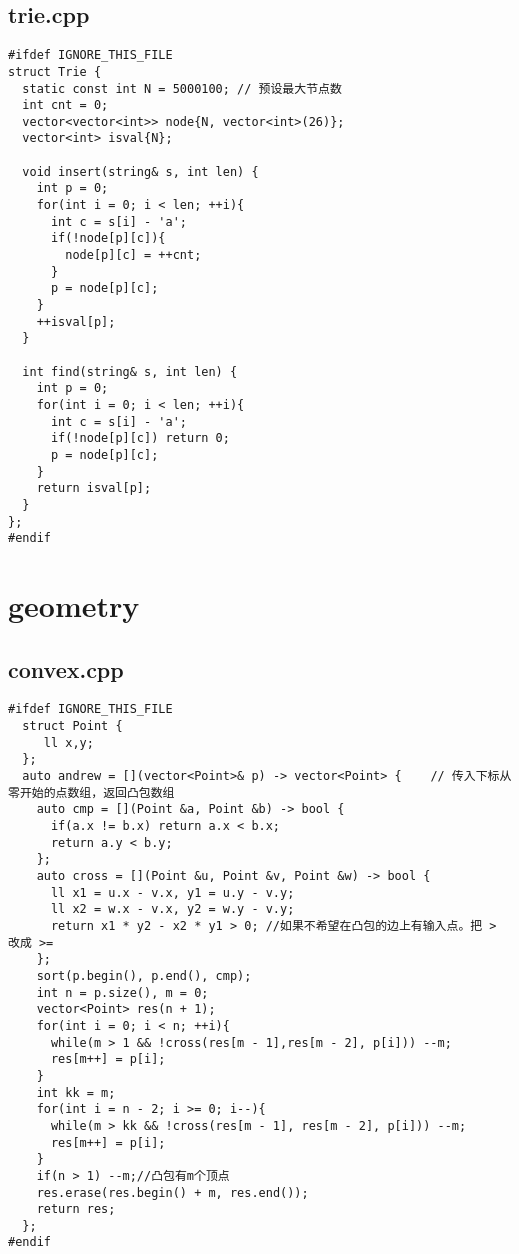 \documentclass[UTF8, a4paper, titlepage, twoside]{ctexart}
\begin{document}
\subsection{trie.cpp}
\begin{verbatim}
#ifdef IGNORE_THIS_FILE
struct Trie {
  static const int N = 5000100; // 预设最大节点数
  int cnt = 0;
  vector<vector<int>> node{N, vector<int>(26)};
  vector<int> isval{N};

  void insert(string& s, int len) {
    int p = 0;
    for(int i = 0; i < len; ++i){
      int c = s[i] - 'a';
      if(!node[p][c]){
        node[p][c] = ++cnt;
      }
      p = node[p][c];
    }
    ++isval[p];
  }

  int find(string& s, int len) {
    int p = 0;
    for(int i = 0; i < len; ++i){
      int c = s[i] - 'a';
      if(!node[p][c]) return 0;
      p = node[p][c];
    }
    return isval[p];
  }
};
#endif
\end{verbatim}

\clearpage
\section{geometry}
\subsection{convex.cpp}
\begin{verbatim}
#ifdef IGNORE_THIS_FILE
  struct Point {
     ll x,y;
  };
  auto andrew = [](vector<Point>& p) -> vector<Point> {    // 传入下标从零开始的点数组，返回凸包数组
    auto cmp = [](Point &a, Point &b) -> bool {
      if(a.x != b.x) return a.x < b.x;
      return a.y < b.y;
    };
    auto cross = [](Point &u, Point &v, Point &w) -> bool {
      ll x1 = u.x - v.x, y1 = u.y - v.y;
      ll x2 = w.x - v.x, y2 = w.y - v.y;
      return x1 * y2 - x2 * y1 > 0; //如果不希望在凸包的边上有输入点。把 > 改成 >=
    };
    sort(p.begin(), p.end(), cmp);
    int n = p.size(), m = 0;
    vector<Point> res(n + 1);
    for(int i = 0; i < n; ++i){
      while(m > 1 && !cross(res[m - 1],res[m - 2], p[i])) --m;
      res[m++] = p[i];
    }
    int kk = m;
    for(int i = n - 2; i >= 0; i--){
      while(m > kk && !cross(res[m - 1], res[m - 2], p[i])) --m;
      res[m++] = p[i];
    }
    if(n > 1) --m;//凸包有m个顶点
    res.erase(res.begin() + m, res.end());
    return res;
  };
#endif
\end{verbatim}
\end{document}
